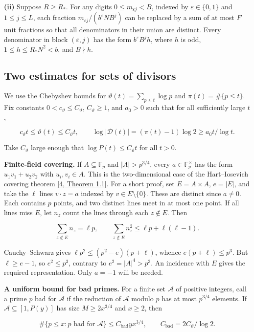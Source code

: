 \documentclass[11pt,a4paper]{article}
\begin{document}
\textbf{(ii)} Suppose $R\ge R_*$. For any digits $0\le m_{\varepsilon j}<B$, indexed by $\varepsilon\in\{0,1\}$ and $1\le j\le L$, each fraction $m_{\varepsilon j}/(b^\varepsilon N B^j)$ can be replaced by a sum of at most $F$ unit fractions so that all denominators in their union are distinct. Every denominator in block $(\varepsilon,j)$ has the form $b^\varepsilon B^j h$, where $h$ is odd, $1\le h\le R_*N^2<b$, and $B\nmid h$.

\subsection{Two estimates for sets of divisors}

We use the Chebyshev bounds for $\vartheta(t)=\sum_{p\le t}\log p$ and $\pi(t)=\#\{p\le t\}$. Fix constants $0<c_\vartheta\le C_\vartheta$, $C_\vartheta\ge1$, and $a_0>0$ such that for all sufficiently large $t$,

\[
c_\vartheta t\le\vartheta(t)\le C_\vartheta t,\qquad
\log|\mathcal D(t)|=(\pi(t)-1)\log 2\ge a_0t/\log t .
\]

Take $C_\vartheta$ large enough that $\log P(t)\le C_\vartheta t$ for all $t>0$.

\textbf{Finite-field covering.} If $A\subseteq\mathbb F_p$ and $|A|>p^{3/4}$, every $a\in\mathbb F_p^\times$ has the form $u_1v_1+u_2v_2$ with $u_i,v_i\in A$. This is the two-dimensional case of the Hart–Iosevich covering theorem \hyperlink{ref-4}{[4, Theorem 1.1]}. For a short proof, set $E=A\times A$, $e=|E|$, and take the $\ell$ lines $v\cdot z=a$ indexed by $v\in E\setminus\{0\}$. These are distinct since $a\ne0$. Each contains $p$ points, and two distinct lines meet in at most one point. If all lines miss $E$, let $n_z$ count the lines through each $z\notin E$. Then

\[
\sum_{z\notin E} n_z=\ell p,\qquad
\sum_{z\notin E} n_z^2\le\ell p+\ell(\ell-1).
\]

Cauchy–Schwarz gives $\ell p^2\le(p^2-e)(p+\ell)$, whence $e(p+\ell)\le p^3$. But $\ell\ge e-1$, so $e^2\le p^3$, contrary to $e^2=|A|^4>p^3$. An incidence with $E$ gives the required representation. Only $a=-1$ will be needed.

\textbf{A uniform bound for bad primes.} For a finite set $\mathcal A$ of positive integers, call a prime $p$ bad for $\mathcal A$ if the reduction of $\mathcal A$ modulo $p$ has at most $p^{3/4}$ elements. If $\mathcal A\subseteq[1,P(y)]$ has size $M\ge2x^{3/4}$ and $x\ge2$, then

\[
\#\{p\le x:p\text{ bad for }\mathcal A\}\le C_{\mathrm{bad}}y x^{3/4},
\qquad C_{\mathrm{bad}}=2C_\vartheta/\log 2 .
\]
\end{document}
